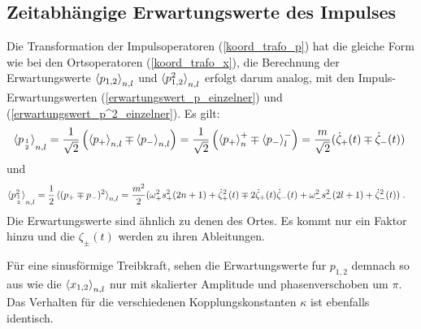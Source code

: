   \subsection{Zeitabhängige Erwartungswerte des Impulses}
    Die Transformation der Impulsoperatoren (\ref{koord_trafo_p}) hat die gleiche Form wie bei den Ortsoperatoren (\ref{koord_trafo_x}), die Berechnung der Erwartungswerte $\braket{p_{1,2}}_{n,l}$ und $\braket{p_{1,2}^2}_{n,l}$ erfolgt darum analog, mit den Impuls-Erwartungswerten (\ref{erwartungswert_p_einzelner}) und (\ref{erwartungswert_p^2_einzelner}).
    Es gilt:
    \begin{align}
      \braket{p_{1 \atop 2}}_{n,l}=\frac{1}{\sqrt{2}}\left(\braket{p_+}_{n,l}\mp\braket{p_-}_{n,l}\right)
      =\frac{1}{\sqrt{2}}\left(\braket{p_+}_n^+\mp\braket{p_-}_l^-\right)
      =\frac{m}{\sqrt{2}}(\dot\zeta_+(t)\mp\dot\zeta_-(t)) \;
    \end{align}
    und
    \begin{align}
      \braket{p^2_{1\atop 2}}_{n,l}&=\frac{1}{2}\braket{(p_+\mp p_-)^2}_{n,l} %
      =\frac {m^2} 2 (\omega_+^2s_+^2(2n+1)+\dot\zeta_+^2(t) \mp 2\dot\zeta_+(t)\dot\zeta_-(t) + \omega_-^2s_-^2(2l+1)+\dot\zeta_-^2(t)) \; .
    \end{align}
    Die Erwartungswerte sind ähnlich zu denen des Ortes.
    Es kommt nur ein Faktor hinzu und die $\zeta_\pm(t)$ werden zu ihren Ableitungen.

    Für eine sinusförmige Treibkraft, sehen die Erwartungswerte fur $p_{1,2}$ demnach so aus wie die $\braket{x_{1,2}}_{n,l}$ nur mit skalierter Amplitude und phasenverschoben um $\pi$.
    Das Verhalten für die verschiedenen Kopplungskonstanten $\kappa$ ist ebenfalls identisch.

